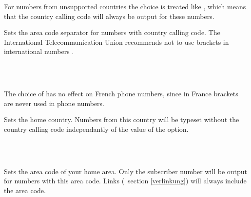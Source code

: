 \documentclass[numbers=noenddot]{scrreprt}
\newcommand*\vglAbschnitt[1]{(\cf\ section \ref{#1})}
\begin{document}
\begin{Befehlsliste}
For numbers from unsupported countries the choice
is treated like
, which means that the country calling code will always be output for these numbers.

Sets the area code separator for numbers with country calling code. The International Telecommunication Union recommends not to use brackets in international numbers \cite[3]{ITU-123}.

\begin{sidebyside}
   \\
   \\
\end{sidebyside}
The choice of
has no effect on French phone numbers, since in France brackets are never used in phone numbers.

Sets the home country. Numbers from this country will be typeset without the country calling code independantly of the value of the  option.
\begin{sidebyside}
   \\
   \\
\end{sidebyside}

Sets the area code of your home area. Only the subscriber number will be output for numbers with this area code. Links
\vglAbschnitt{verlinkung}
will always include the area code.


\end{Befehlsliste}
\end{document}

